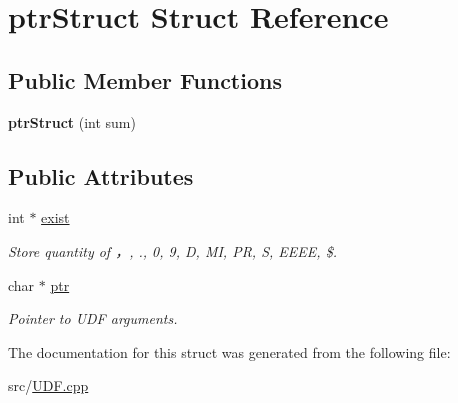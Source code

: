 \hypertarget{structptr_struct}{}\section{ptr\+Struct Struct Reference}
\label{structptr_struct}
\subsection*{Public Member Functions}
\begin{DoxyCompactItemize}
\item 
\mbox{\label{structptr_struct_a6d0a6c8c619311fcbe7bf7c25a7a9acb}} 
{\bfseries ptr\+Struct} (int sum)
\end{DoxyCompactItemize}
\subsection*{Public Attributes}
\begin{DoxyCompactItemize}
\item 
\mbox{\label{structptr_struct_a2a4b660ecf4927190a70a30e719045ce}} 
int $\ast$ \hyperlink{structptr_struct_a2a4b660ecf4927190a70a30e719045ce}{exist}
\begin{DoxyCompactList}\small\item\em Store quantity of \textquotesingle{}，\textquotesingle{}, \textquotesingle{}.\textquotesingle{}, \textquotesingle{}0\textquotesingle{}, \textquotesingle{}9\textquotesingle{}, \textquotesingle{}D\textquotesingle{}, \textquotesingle{}MI\textquotesingle{}, \textquotesingle{}PR\textquotesingle{}, \textquotesingle{}S\textquotesingle{}, \textquotesingle{}E\+E\+EE\textquotesingle{}, \textquotesingle{}\$\textquotesingle{}. \end{DoxyCompactList}\item 
\mbox{\label{structptr_struct_a432776f8dfb06fa2a822fa3e28b27783}} 
char $\ast$ \hyperlink{structptr_struct_a432776f8dfb06fa2a822fa3e28b27783}{ptr}
\begin{DoxyCompactList}\small\item\em Pointer to U\+DF arguments. \end{DoxyCompactList}\end{DoxyCompactItemize}


The documentation for this struct was generated from the following file\+:\begin{DoxyCompactItemize}
\item 
src/\hyperlink{_u_d_f_8cpp}{U\+D\+F.\+cpp}\end{DoxyCompactItemize}

